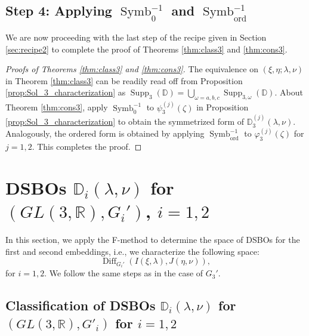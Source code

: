 \documentclass[a4paper,11pt,reqno]{amsart}
\newcommand{\DD}{\mathbb{D}}
\newcommand{\0}{{\bf 0}}
\newcommand{\R}{\mathbb{R}}
\newcommand{\1}{{\bf 1}}
\newcommand{\ord}{{\mathrm{ord}}}
\DeclareMathOperator{\Supp}{Supp}
\DeclareMathOperator{\Diff}{Diff}
\DeclareMathOperator{\Symb}{Symb}
\theoremstyle{plain}
\theoremstyle{definition}
\numberwithin{equation}{section}
\theoremstyle{definition}
\begin{document}
\subsection{Step 4: Applying \texorpdfstring{$\Symb_0^{-1}$}{Symb_0^{-1}} and
\texorpdfstring{$\Symb_{\ord}^{-1}$}{Symb_ord^{-1}}}
\label{sec:Step4}

We are now proceeding with the last step of the recipe given in 
Section \ref{sec:recipe2} to complete the proof of Theorems \ref{thm:class3} and \ref{thm:cons3}. 

\begin{proof}[Proofs of  Theorems \ref{thm:class3} and \ref{thm:cons3}]
The equivalence on $(\xi, \eta; \lambda, \nu)$ in Theorem  \ref{thm:class3}
can be readily read off from Proposition \ref{prop:Sol_3_characterization} as
$\Supp_3(\DD) = \bigcup_{\omega=a, b, c} \Supp_{3,\omega}(\DD)$.
About Theorem \ref{thm:cons3}, 
apply $\Symb_0^{-1}$ to $\psi^{(j)}_3(\zeta)$ 
in Proposition \ref{prop:Sol_3_characterization} to obtain the symmetrized form
of $\DD_{3}^{(j)}(\lambda,\nu)$. Analogously, the ordered form is obtained by applying 
 $\Symb_{\ord}^{-1}$ to $\varphi^{(j)}_3(\zeta)$  for $j=1,2$.
 This completes the proof. 
\end{proof}

\section{DSBOs \texorpdfstring{$\DD_i(\lambda,\nu)$}{Di(λ,ν)} for \texorpdfstring{$(GL(3,\R), G_i')$}{(GL(3,R),Gi')}, \texorpdfstring{$i=1,2$}{i=1,2}}
\label{sec:Emb12}

In this section, we apply the F-method to determine the space of DSBOs for the first and second embeddings, i.e., we characterize the following space:
\begin{equation*}
\Diff_{G_i'}(I(\xi, \lambda), J(\eta, \nu)),
\end{equation*}
for $i=1,2$. We follow the same steps as in the case of $G_3'$.

\subsection{Classification of DSBOs \texorpdfstring{$\DD_i(\lambda,\nu)$}{D_i(λ,ν)} 
for \texorpdfstring{$(GL(3, \R), G'_i)$}{(GL(3,R),G_i')} for \texorpdfstring{$i=1,2$}{i=1,2}}
\label{sec:ClassThmsDSBOs2}
\end{document}
